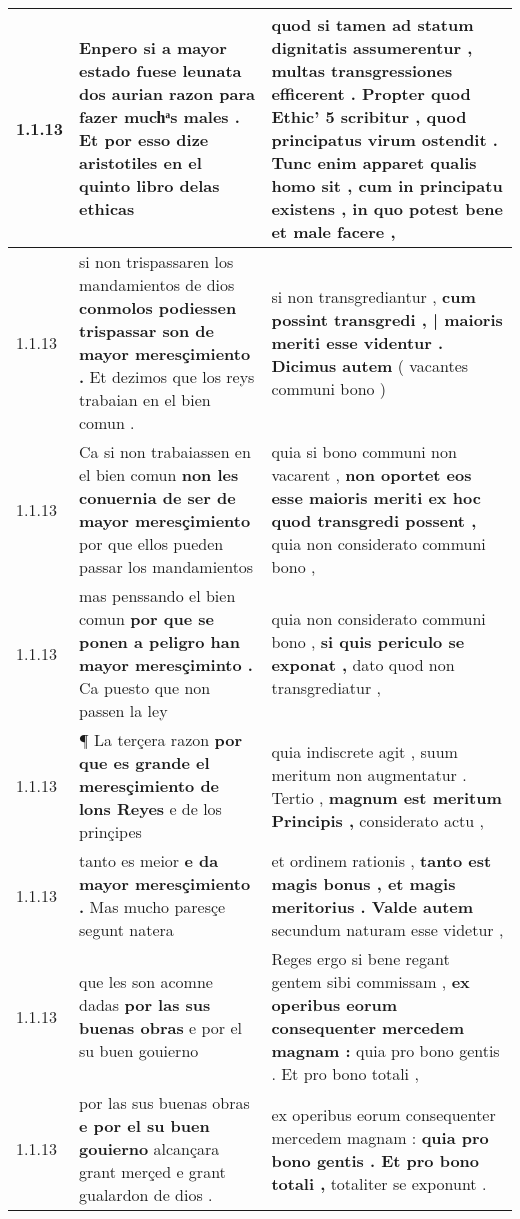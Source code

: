 \begin{tabular}{|p{1cm}|p{6.5cm}|p{6.5cm}|}
1.1.13 & Enpero si a mayor estado fuese leunata dos aurian razon \textbf{ para fazer muchͣs males . } Et por esso dize aristotiles en el quinto libro delas ethicas & quod si tamen ad statum dignitatis assumerentur , \textbf{ multas transgressiones efficerent . Propter quod Ethic’ 5 scribitur , } quod principatus virum ostendit . Tunc enim apparet qualis homo sit , cum in principatu existens , in quo potest bene et male facere , \\\hline
1.1.13 & si non trispassaren los mandamientos de dios \textbf{ conmolos podiessen trispassar son de mayor meresçimiento . } Et dezimos que los reys trabaian en el bien comun . & si non transgrediantur , \textbf{ cum possint transgredi , | maioris meriti esse videntur . Dicimus autem } ( vacantes communi bono ) \\\hline
1.1.13 & Ca si non trabaiassen en el bien comun \textbf{ non les conuernia de ser de mayor meresçimiento } por que ellos pueden passar los mandamientos & quia si bono communi non vacarent , \textbf{ non oportet eos esse maioris meriti ex hoc quod transgredi possent , } quia non considerato communi bono , \\\hline
1.1.13 & mas penssando el bien comun \textbf{ por que se ponen a peligro han mayor meresçiminto . } Ca puesto que non passen la ley & quia non considerato communi bono , \textbf{ si quis periculo se exponat , } dato quod non transgrediatur , \\\hline
1.1.13 & ¶ La terçera razon \textbf{ por que es grande el meresçimiento de lons Reyes } e de los prinçipes & quia indiscrete agit , suum meritum non augmentatur . Tertio , \textbf{ magnum est meritum Principis , } considerato actu , \\\hline
1.1.13 & tanto es meior \textbf{ e da mayor meresçimiento . } Mas mucho paresçe segunt natera & et ordinem rationis , \textbf{ tanto est magis bonus , et magis meritorius . Valde autem } secundum naturam esse videtur , \\\hline
1.1.13 & que les son acomne dadas \textbf{ por las sus buenas obras } e por el su buen gouierno & Reges ergo si bene regant gentem sibi commissam , \textbf{ ex operibus eorum consequenter mercedem magnam : } quia pro bono gentis . Et pro bono totali , \\\hline
1.1.13 & por las sus buenas obras \textbf{ e por el su buen gouierno } alcançara grant merçed e grant gualardon de dios . & ex operibus eorum consequenter mercedem magnam : \textbf{ quia pro bono gentis . Et pro bono totali , } totaliter se exponunt . \\\hline

\end{tabular}
